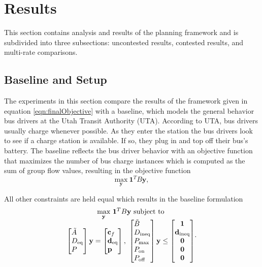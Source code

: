 \section{Results}
This section contains analysis and results of the planning framework and is subdivided into three subsections: uncontested results, contested results, and multi-rate comparisons.  
\subsection{Baseline and Setup}
The experiments in this section compare the results of the framework given in equation \ref{eqn:finalObjective} with a baseline, which models the general behavior bus drivers at the Utah Transit Authority (UTA). According to UTA, bus drivers usually charge whenever possible.  As they enter the station the bus drivers look to see if a charge station is available. If so, they plug in and top off their bus's battery. The baseline reflects the bus driver behavior with an objective function that maximizes the number of bus charge instances which is computed as the sum of group flow values, resulting in the objective function
\begin{equation}
	\underset{\mathbf{y}}{\text{max}} \ \mathbf{1}^TB\mathbf{y},
\end{equation}
\par All other constraints are held equal which results in the baseline formulation 
\begin{equation}\label{eqn:finalBaselineObjective}
	\begin{matrix*}[c]
		\underset{\mathbf{y}}{\scalebox{1}{\text{max}}} \ \mathbf{1}^TB\mathbf{y} \ \text{subject to}\\
		\begin{bmatrix*}[l]
				\tilde{A} \\
				D_{\text{eq}} \\
				P
				\end{bmatrix*} \mathbf{y} = \begin{bmatrix*}[l]\mathbf{c}_f \\ \mathbf{d}_{\text{eq}}\\\mathbf{p} \end{bmatrix*}, \ \begin{bmatrix*}[l]
			\tilde{B} \\
			D_{\text{ineq}} \\ 
			P_{\text{max}} \\
			P_{\text{on}} \\
			P_{\text{off}}
			\end{bmatrix*}\mathbf{y} \le \begin{bmatrix*}\mathbf{1} \\ \mathbf{d}_{\text{ineq}} \\ \mathbf{0} \\ \mathbf{0} \\ \mathbf{0} \end{bmatrix*}
	\end{matrix*}.
\end{equation}
